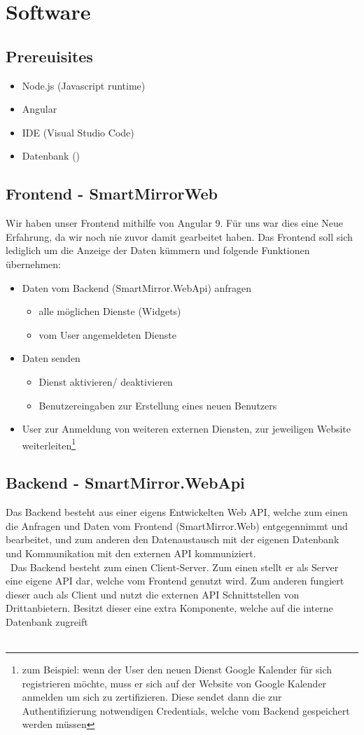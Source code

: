 \documentclass[a4paper,11pt]{article}
\begin{document}
\section{Software}
\subsection{Prereuisites}
\begin{itemize}
\item Node.js (Javascript runtime)
\item Angular
\item IDE (Visual Studio Code)
\item Datenbank ()
\end{itemize}

\subsection{Frontend - SmartMirrorWeb}
Wir haben unser Frontend mithilfe von Angular 9. Für uns war dies eine Neue Erfahrung, da wir noch nie zuvor damit gearbeitet haben. Das Frontend soll sich lediglich um die Anzeige der Daten kümmern und folgende Funktionen übernehmen:
\begin{itemize}
\item Daten vom Backend (SmartMirror.WebApi) anfragen
\begin{itemize}
\item alle möglichen Dienste (Widgets)
\item vom User angemeldeten Dienste
\end{itemize}
\item Daten senden
\begin{itemize}
\item Dienst aktivieren/ deaktivieren
\item Benutzereingaben zur Erstellung eines neuen Benutzers
\end{itemize}
\item User zur Anmeldung von weiteren externen Diensten, zur jeweiligen Website weiterleiten\footnote{zum Beispiel: wenn der User den neuen Dienst Google Kalender für sich registrieren möchte, muss er sich auf der Website von Google Kalender anmelden um sich zu zertifizieren. Diese sendet dann die zur Authentifizierung notwendigen Credentials, welche vom Backend gespeichert werden müssen }
\end{itemize} 
\subsection{Backend - SmartMirror.WebApi}
Das Backend besteht aus einer eigens Entwickelten Web API, welche zum einen die Anfragen und Daten vom Frontend (SmartMirror.Web) entgegennimmt und bearbeitet, und zum anderen den Datenaustausch mit der eigenen Datenbank und Kommunikation mit den externen API kommuniziert.\\\
Das Backend besteht zum einen Client-Server. Zum einen stellt er als Server eine eigene API dar, welche vom Frontend genutzt wird. Zum anderen fungiert dieser auch als Client und nutzt die externen API Schnittstellen von Drittanbietern. Besitzt dieser eine extra Komponente, welche auf die interne Datenbank zugreift\\\
\end{document}

